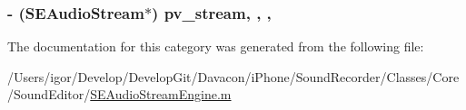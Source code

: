 \hypertarget{category_s_e_audio_stream_engine_07_08_ab9879d1cd039675a837837ccd094b956}{
\subsubsection[{pv\-\_\-stream}]{\setlength{\rightskip}{0pt plus 5cm}-\/ ({\bf S\-E\-Audio\-Stream}$\ast$) pv\-\_\-stream\hspace{0.3cm}{\ttfamily [read]}, {\ttfamily [write]}, {\ttfamily [nonatomic]}, {\ttfamily [strong]}}}\label{category_s_e_audio_stream_engine_07_08_ab9879d1cd039675a837837ccd094b956}


The documentation for this category was generated from the following file\-:\begin{DoxyCompactItemize}
\item 
/\-Users/igor/\-Develop/\-Develop\-Git/\-Davacon/i\-Phone/\-Sound\-Recorder/\-Classes/\-Core/\-Sound\-Editor/\hyperlink{_s_e_audio_stream_engine_8m}{S\-E\-Audio\-Stream\-Engine.\-m}\end{DoxyCompactItemize}
